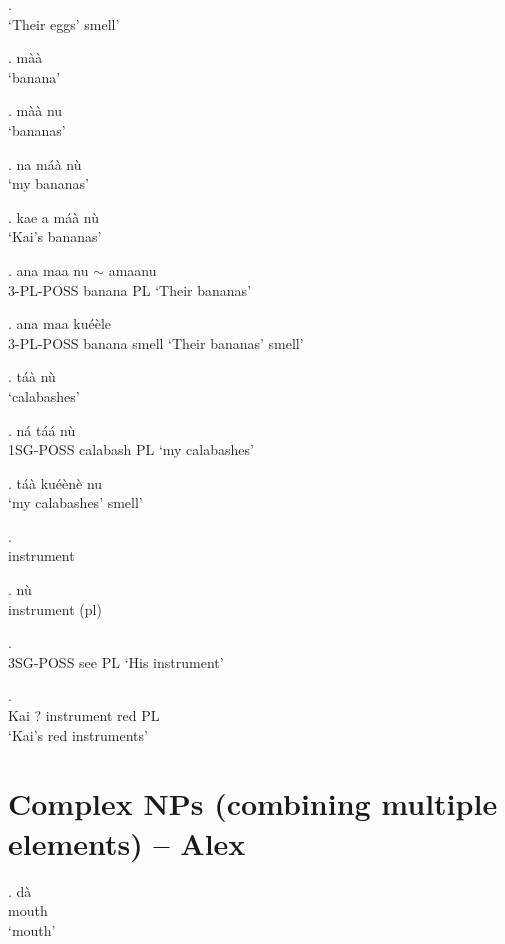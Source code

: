 \documentclass{assets/fieldnotes}
\begin{document}
\ex.  \\
`Their eggs' smell' 

\ex. màà \\
`banana'

\ex. màà nu \\
`bananas'

\ex. na máà nù \\
`my bananas'

\ex. kae a máà nù \\
`Kai's bananas'

\exg. ana maa nu $\sim$ amaanu \\
3-PL-POSS banana PL
`Their bananas'


\ex. ana maa ku\textipa{\textltailn}éèle \\
3-PL-POSS banana smell
`Their bananas' smell'

\ex. táà nù \\
`calabashes' 

\ex. ná táá nù \\
1SG-POSS calabash PL
`my calabashes'

\ex. táà ku\textipa{\textltailn}éènè nu \\
`my calabashes' smell'

\ex.  \\
instrument

\ex.  nù \\
instrument (pl)

\ex.  \\
3SG-POSS see PL
`His instrument'

\exg.  \\
Kai ? instrument red PL \\
`Kai's red instruments'




\section{Complex NPs (combining multiple elements) -- Alex} 

\exg.
dà    \\
mouth \\
`mouth'
\end{document}
